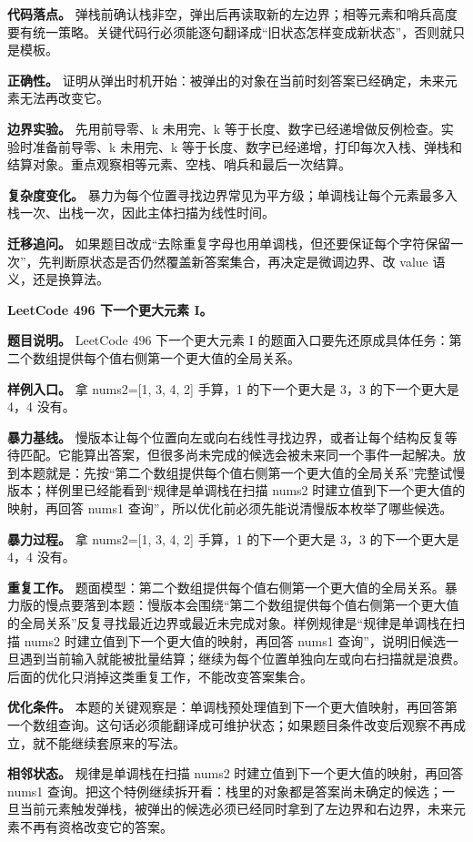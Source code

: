 \textbf{代码落点。} 弹栈前确认栈非空，弹出后再读取新的左边界；相等元素和哨兵高度要有统一策略。关键代码行必须能逐句翻译成“旧状态怎样变成新状态”，否则就只是模板。

\textbf{正确性。} 证明从弹出时机开始：被弹出的对象在当前时刻答案已经确定，未来元素无法再改变它。

\textbf{边界实验。} 先用前导零、k 未用完、k 等于长度、数字已经递增做反例检查。实验时准备前导零、k 未用完、k 等于长度、数字已经递增，打印每次入栈、弹栈和结算对象。重点观察相等元素、空栈、哨兵和最后一次结算。

\textbf{复杂度变化。} 暴力为每个位置寻找边界常见为平方级；单调栈让每个元素最多入栈一次、出栈一次，因此主体扫描为线性时间。

\textbf{迁移追问。} 如果题目改成“去除重复字母也用单调栈，但还要保证每个字符保留一次”，先判断原状态是否仍然覆盖新答案集合，再决定是微调边界、改 value 语义，还是换算法。

\noindent\textbf{LeetCode 496 下一个更大元素 I。}

\textbf{题目说明。} LeetCode 496 下一个更大元素 I 的题面入口要先还原成具体任务：第二个数组提供每个值右侧第一个更大值的全局关系。

\textbf{样例入口。} 拿 nums2=[1, 3, 4, 2] 手算，1 的下一个更大是 3，3 的下一个更大是 4，4 没有。

\textbf{暴力基线。} 慢版本让每个位置向左或向右线性寻找边界，或者让每个结构反复等待匹配。它能算出答案，但很多尚未完成的候选会被未来同一个事件一起解决。放到本题就是：先按“第二个数组提供每个值右侧第一个更大值的全局关系”完整试慢版本；样例里已经能看到“规律是单调栈在扫描 nums2 时建立值到下一个更大值的映射，再回答 nums1 查询”，所以优化前必须先能说清慢版本枚举了哪些候选。

\textbf{暴力过程。} 拿 nums2=[1, 3, 4, 2] 手算，1 的下一个更大是 3，3 的下一个更大是 4，4 没有。

\textbf{重复工作。} 题面模型：第二个数组提供每个值右侧第一个更大值的全局关系。暴力版的慢点要落到本题：慢版本会围绕“第二个数组提供每个值右侧第一个更大值的全局关系”反复寻找最近边界或最近未完成对象。样例规律是“规律是单调栈在扫描 nums2 时建立值到下一个更大值的映射，再回答 nums1 查询”，说明旧候选一旦遇到当前输入就能被批量结算；继续为每个位置单独向左或向右扫描就是浪费。后面的优化只消掉这类重复工作，不能改变答案集合。

\textbf{优化条件。} 本题的关键观察是：单调栈预处理值到下一个更大值映射，再回答第一个数组查询。这句话必须能翻译成可维护状态；如果题目条件改变后观察不再成立，就不能继续套原来的写法。

\textbf{相邻状态。} 规律是单调栈在扫描 nums2 时建立值到下一个更大值的映射，再回答 nums1 查询。把这个特例继续拆开看：栈里的对象都是答案尚未确定的候选；一旦当前元素触发弹栈，被弹出的候选必须已经同时拿到了左边界和右边界，未来元素不再有资格改变它的答案。

